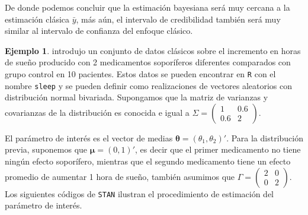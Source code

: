 \documentclass[
  10pt,
  spanish,
]{book}
\theoremstyle{definition}
\theoremstyle{definition}
\newtheorem{example}{Ejemplo}[chapter]
\theoremstyle{definition}
\theoremstyle{definition}
\theoremstyle{remark}
\begin{document}
De donde podemos concluir que la estimación bayesiana será muy cercana a la estimación clásica \(\bar{y}\), más aún, el intervalo de credibilidad también será muy similar al intervalo de confianza del enfoque clásico.

\begin{example}
\protect\hypertarget{exm:EjeStudent}{}{\label{exm:EjeStudent} }\citet{Student} introdujo un conjunto de datos clásicos sobre el incremento en horas de sueño producido con 2 medicamentos soporíferos diferentes comparados con grupo control en 10 pacientes. Estos datos se pueden encontrar en \texttt{R} con el nombre \texttt{sleep} y se pueden definir como realizaciones de vectores aleatorios con distribución normal bivariada. Supongamos que la matriz de varianzas y covarianzas de la distribución es conocida e igual a \(\Sigma=\begin{pmatrix}1&0.6\\ 0.6&2\end{pmatrix}\).

El parámetro de interés es el vector de medias \(\boldsymbol \theta=(\theta_1,\theta_2)'\). Para la distribución previa, suponemos que \(\boldsymbol \mu=(0,1)'\), es decir que el primer medicamento no tiene ningún efecto soporífero, mientras que el segundo medicamento tiene un efecto promedio de aumentar 1 hora de sueño, también asumimos que \(\Gamma=\begin{pmatrix}2&0\\ 0&2\end{pmatrix}\). Los siguientes códigos de \texttt{STAN} ilustran el procedimiento de estimación del parámetro de interés.
\end{example}
\end{document}
